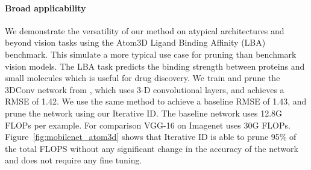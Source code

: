 

\paragraph{Broad applicability}
We demonstrate the versatility of our method on atypical architectures and beyond vision tasks using the Atom3D Ligand Binding Affinity (LBA) \cite{atom3d} benchmark. This simulate a more typical use case for pruning than benchmark vision models. The LBA task predicts the binding strength between proteins and small molecules which is useful for drug discovery. We train and prune the 3DConv network from \cite{atom3d}, which uses 3-D convolutional layers, and achieves a RMSE of 
1.42.
We use the same method to achieve a baseline RMSE of 1.43, and prune the network using our Iterative ID. The baseline network uses 12.8G FLOPs per example. For comparison VGG-16 on Imagenet uses 30G FLOPs. Figure~\ref{fig:mobilenet_atom3d} shows that Iterative ID is able to prune 95\% of the total FLOPS without any significant change in the accuracy of the network and does not require any fine tuning.  %

